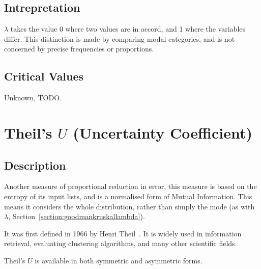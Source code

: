 \documentclass[11pt]{article}
\begin{document}

\subsection{Intrepretation}
$\lambda$ takes the value 0 where two values are in accord, and 1 where the variables differ.  This distinction is made by comparing modal categories, and is not concerned by precise frequencies or proportions.

\subsection{Critical Values}
Unknown, TODO.








%
\section{Theil's $U$ (Uncertainty Coefficient)}
\label{section:theilu}
\subsection{Description}
Another measure of proportional reduction in error, this measure is based on the entropy of its input lists, and is a normalised form of Mutual Information.  This means it considers the whole distribution, rather than simply the mode (as with $\lambda$, Section~\ref{section:goodmankruskallambda}).  

It was first defined in 1966 by Henri Theil~\cite{theil1966applied}.  It is widely used in information retrieval, evaluating clustering algorithms, and many other scientific fields.

Theil's $U$ is available in both symmetric and asymmetric forms.

\end{document}
